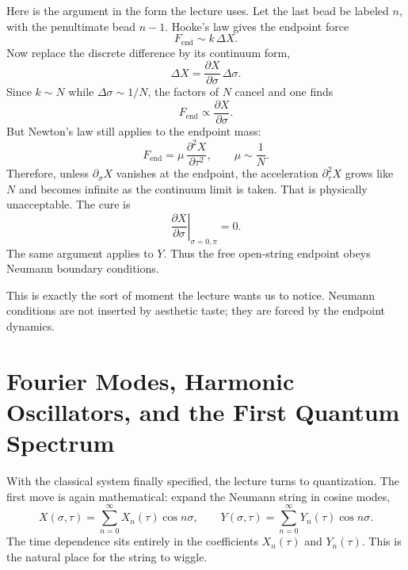 Here is the argument in the form the lecture uses. Let the last bead be labeled \(n\), with the penultimate bead \(n-1\). Hooke's law gives the endpoint force
\begin{equation}
F_{\mathrm{end}}\sim k\,\Delta X .
\end{equation}
Now replace the discrete difference by its continuum form,
\begin{equation}
\Delta X=\frac{\partial X}{\partial \sigma}\,\Delta \sigma .
\end{equation}
Since \(k\sim N\) while \(\Delta \sigma\sim 1/N\), the factors of \(N\) cancel and one finds
\begin{equation}
F_{\mathrm{end}} \propto \frac{\partial X}{\partial \sigma}.
\end{equation}
But Newton's law still applies to the endpoint mass:
\begin{equation}
F_{\mathrm{end}}=\mu\,\frac{\partial^2 X}{\partial \tau^2},
\qquad
\mu\sim \frac{1}{N}.
\end{equation}
Therefore, unless \(\partial_\sigma X\) vanishes at the endpoint, the acceleration \(\partial_\tau^2 X\) grows like \(N\) and becomes infinite as the continuum limit is taken. That is physically unacceptable. The cure is
\begin{equation}
\left.\frac{\partial X}{\partial \sigma}\right|_{\sigma=0,\pi}=0.
\end{equation}
The same argument applies to \(Y\). Thus the free open-string endpoint obeys Neumann boundary conditions.

This is exactly the sort of moment the lecture wants us to notice. Neumann conditions are not inserted by aesthetic taste; they are forced by the endpoint dynamics.

\section{Fourier Modes, Harmonic Oscillators, and the First Quantum Spectrum}

With the classical system finally specified, the lecture turns to quantization. The first move is again mathematical: expand the Neumann string in cosine modes,
\begin{equation}
X(\sigma,\tau)=\sum_{n=0}^{\infty} X_n(\tau)\cos n\sigma,
\qquad
Y(\sigma,\tau)=\sum_{n=0}^{\infty} Y_n(\tau)\cos n\sigma.
\end{equation}
The time dependence sits entirely in the coefficients \(X_n(\tau)\) and \(Y_n(\tau)\). This is the natural place for the string to wiggle.

